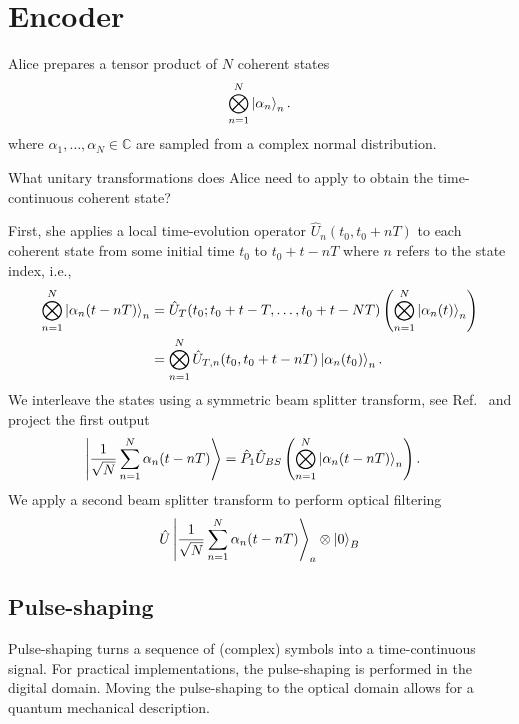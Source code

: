 \section{Encoder}

Alice prepares a tensor product of $N$ coherent states
\begin{equation}
	\bigotimes_{n=1}^N
	\ket{\alpha_n}_n
	.
\end{equation}
where $\alpha_1,\dots,\alpha_N\in\mathbb{C}$ are sampled from a complex normal distribution.

What unitary transformations does Alice need to apply to obtain the time-continuous coherent state?

First, she applies a local time-evolution operator $\hat{U}_n\left(t_0,t_0+nT\right)$ to each coherent state from some initial time $t_0$ to $t_0+t-nT$ where $n$ refers to the state index, i.e.,
\begin{equation}
	\begin{split}
		\bigotimes_{n=1}^N
		\ket{\alpha_n(t-nT)}_n
		&=
		\hat{U}_T(t_0;t_0+t-T,\dots,t_0+t-NT)
		\left(
			\bigotimes_{n=1}^N
			\ket{\alpha_n(t)}_n
		\right)
		\\
		&=
		\bigotimes_{n=1}^N
		\hat{U}_{T,n}(t_0,t_0+t-nT)
		\ket{\alpha_n(t_0)}_n
		.
	\end{split}
\end{equation}
We interleave the states using a symmetric beam splitter transform, see Ref.~\cite{Zukowski1997} and project the first output
\begin{equation}
	\begin{split}
		\ket{\frac{1}{\sqrt{N}}\sum_{n=1}^N\alpha_n(t-nT)}
		&=
		\hat{P}_1
		\hat{U}_{BS}
		\left(
			\bigotimes_{n=1}^N
			\ket{\alpha_n(t-nT)}_n
		\right)
		.
	\end{split}
\end{equation}
We apply a second beam splitter transform to perform optical filtering
\begin{equation}
	\begin{split}
		\hat{U}
		\ket{\frac{1}{\sqrt{N}}\sum_{n=1}^N\alpha_n(t-nT)}_a
		\otimes
		\ket{0}_B
	\end{split}
\end{equation}

\subsection{Pulse-shaping}

Pulse-shaping turns a sequence of (complex) symbols into a time-continuous signal.
For practical implementations, the pulse-shaping is performed in the digital domain.
Moving the pulse-shaping to the optical domain allows for a quantum mechanical description.

